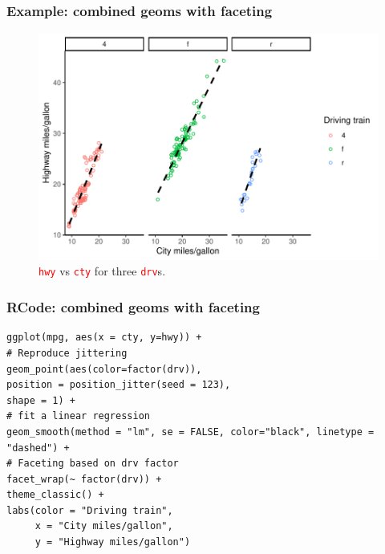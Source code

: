 \documentclass{beamer}
\begin{document}
\begin{frame}\frametitle{Example: combined geoms with faceting}
\begin{figure}
\includegraphics[width=0.99\linewidth]{PlotsLec2/hwy_cty_drv}
\caption{\small{\textcolor{red}{\texttt{hwy}} vs \textcolor{red}{\texttt{cty}} for three \textcolor{red}{\texttt{drv}}s.}}
\end{figure}
\end{frame}

\begin{frame}[fragile]\frametitle{RCode: combined geoms with faceting}
\begin{lstlisting}
ggplot(mpg, aes(x = cty, y=hwy)) +
# Reproduce jittering
geom_point(aes(color=factor(drv)), 
position = position_jitter(seed = 123),
shape = 1) +
# fit a linear regression
geom_smooth(method = "lm", se = FALSE, color="black", linetype = "dashed") +
# Faceting based on drv factor
facet_wrap(~ factor(drv)) +
theme_classic() +
labs(color = "Driving train",
     x = "City miles/gallon",
     y = "Highway miles/gallon")
\end{lstlisting}
\end{frame}
\end{document}
